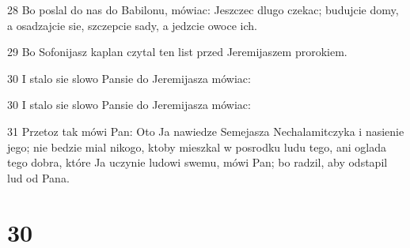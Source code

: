 \par 28 Bo poslal do nas do Babilonu, mówiac: Jeszczec dlugo czekac; budujcie domy, a osadzajcie sie, szczepcie sady, a jedzcie owoce ich.
\par 29 Bo Sofonijasz kaplan czytal ten list przed Jeremijaszem prorokiem.
\par 30 I stalo sie slowo Pansie do Jeremijasza mówiac:
\par 30 I stalo sie slowo Pansie do Jeremijasza mówiac:
\par 31 Przetoz tak mówi Pan: Oto Ja nawiedze Semejasza Nechalamitczyka i nasienie jego; nie bedzie mial nikogo, ktoby mieszkal w posrodku ludu tego, ani oglada tego dobra, które Ja uczynie ludowi swemu, mówi Pan; bo radzil, aby odstapil lud od Pana.

\chapter{30}

